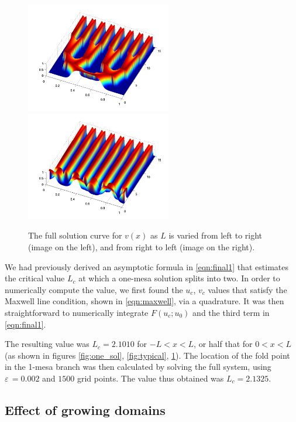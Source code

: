 \documentclass[a4paper,10pt]{article}
\newcommand{\Ep}{\ensuremath{\varepsilon\,}}
\begin{document}
% 
\begin{figure}[htb]
\begin{center}
\includegraphics[width=2.5in]{full_soln_up}\includegraphics[width=2.5in]{full_soln_down}
\caption{The full solution curve for $v(x)$ as $L$ is varied from left to right (image on the left), and from right to left (image on the right).}
\label{fig:up_down}
\end{center}
\end{figure}
% 

We had previously derived an asymptotic formula in \eqref{eqn:final1} that estimates the critical value $L_c$ at which a one-mesa solution splits into two. In order to numerically compute the value, we first found the $u_c$, $v_c$ values that satisfy the Maxwell line condition, shown in \eqref{eqn:maxwell}, via a quadrature. It was then straightforward to numerically integrate $F(u_c;u_0)$ and the third term in \eqref{eqn:final1}. 

The resulting value was $L_c = 2.1010$ for $-L<x<L$, or half that for $0<x<L$ (as shown in figures \ref{fig:one_sol}, \ref{fig:typical}, \ref{fig:up_down}). The location of the fold point in the 1-mesa branch was then calculated by solving the full system, using $\Ep=0.002$ and $1500$ grid points. The value thus obtained was $L_c = 2.1325$.

\subsection{Effect of growing domains}
\end{document}
